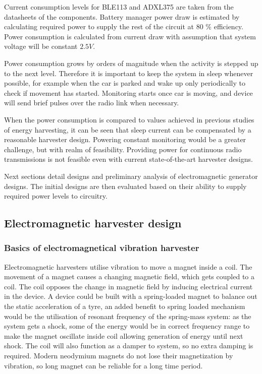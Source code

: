 Current consumption levels for BLE113 and ADXL375 are taken from the datasheets of the components. Battery manager power draw is estimated by calculating required power to supply the rest of the circuit at 80 \% efficiency. Power consumption is calculated from current draw with assumption that system voltage will be constant $2.5 V$.

Power consumption grows by orders of magnitude when the activity is stepped up to the next level. Therefore it is important to keep the system in sleep whenever possible, for example when the car is parked and wake up only periodically to check if movement has started. Monitoring starts once car is moving, and device will send brief pulses over the radio link when necessary.

When the power consumption is compared to values achieved in previous studies of energy harvesting, it can be seen that sleep current can be compensated by a reasonable harvester design. Powering constant monitoring would be a greater challenge, but with realm of feasibility. Providing power for continuous radio transmissions is not feasible even with current state-of-the-art harvester designs. 

Next sections detail designs and preliminary analysis of electromagnetic generator designs. The initial designs are then evaluated based on their ability to supply required power levels to circuitry.

\subsection{Electromagnetic harvester design}
\subsubsection{Basics of electromagnetical vibration harvester}
Electromagnetic harvesters utilise vibration to move a magnet inside a coil. The movement of a magnet causes a changing magnetic field, which gets coupled to a coil. The coil opposes the change in magnetic field by inducing electrical current in the device. A device could be built with a spring-loaded magnet to balance out the static acceleration of a tyre, an added benefit to spring loaded mechanism would be the utilisation of resonant frequency of the spring-mass system: as the system gets a shock, some of the energy would be in correct frequency range to make the magnet oscillate inside coil allowing generation of energy until next shock. The coil will also function as a damper to system, so no extra damping is required. Modern neodymium magnets do not lose their magnetization by vibration, so long magnet can be reliable for a long time period. 


